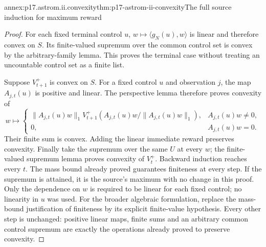 \begin{annexitem}{annex:p17.astrom.ii.convexity}{thm:p17-astrom-ii-convexity}{The full source induction for maximum reward}
\begin{proof}
For each fixed terminal control \(u\),
\(w\mapsto\langle g_N(u),w\rangle\) is linear
and therefore convex on \(S\).
Its finite-valued supremum over the common control
set is convex by the arbitrary-family lemma.
This proves the terminal case without treating
an uncountable control set as a finite list.

Suppose \(V_{t+1}^+\) is convex on \(S\).
For a fixed control \(u\) and observation \(j\),
the map \(A_{j,t}(u)\) is positive and linear.
The perspective lemma therefore proves convexity of
\[
       w\longmapsto
       \begin{cases}
       \|A_{j,t}(u)w\|_1
          V_{t+1}^+(A_{j,t}(u)w/\|A_{j,t}(u)w\|_1),
                                 &A_{j,t}(u)w\ne0,\\
       0,&A_{j,t}(u)w=0.
       \end{cases}
\]
Their finite sum is convex. Adding the linear
immediate reward preserves convexity.
Finally take the supremum over the same \(U\)
at every \(w\); the finite-valued supremum lemma
proves convexity of \(V_t^+\).
Backward induction reaches every \(t\).
The mass bound already proved guarantees finiteness
at every step. If the supremum is attained, it
is the source's maximum with no change in this proof.
Only the dependence on \(w\) is required to be
linear for each fixed control; no linearity
in \(u\) was used.
For the broader algebraic formulation, replace the
mass-bound justification of finiteness by its explicit
finite-value hypothesis. Every other step is unchanged:
positive linear maps, finite sums and an arbitrary
common control supremum are exactly the operations
already proved to preserve convexity.
\end{proof}
\end{annexitem}

